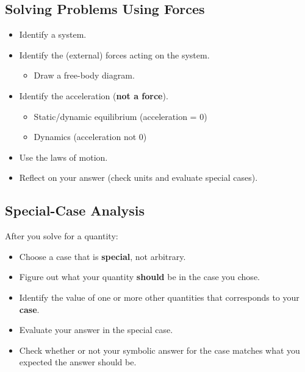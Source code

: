 \documentclass[]{article}
\begin{document}
\begin{PresentSpace}
\vspace{-10pt}
\section*{Solving Problems Using Forces}
\vspace{-10pt}
\begin{itemize}
	\item Identify a system.
	\item Identify the (external) forces acting on the system.
	\begin{itemize}
		\item Draw a free-body diagram.
	\end{itemize}
	\item Identify the acceleration (\textbf{not a force}).
	\begin{itemize}
		\item Static/dynamic equilibrium (acceleration = 0)
		\item Dynamics (acceleration not 0)
	\end{itemize}
	\item Use the laws of motion.
	\item Reflect on your answer (check units and evaluate special cases).
\end{itemize}
\end{PresentSpace}
\newpage
\begin{TeacherMargin}

\end{TeacherMargin}
\begin{PresentSpace}
\vspace{-10pt}
\section*{Special-Case Analysis}
\vspace{-10pt}
After you solve for a quantity:
\begin{itemize}
	\item Choose a case that is \textbf{special}, not arbitrary.
	\item Figure out what your quantity \textbf{should} be in the case you chose.
	\item Identify the value of one or more other quantities that corresponds to your \textbf{case}.
	\item Evaluate your answer in the special case.
	\item Check whether or not your symbolic answer for the case matches what you expected the answer should be.
\end{itemize}
\end{PresentSpace}
\end{document}
